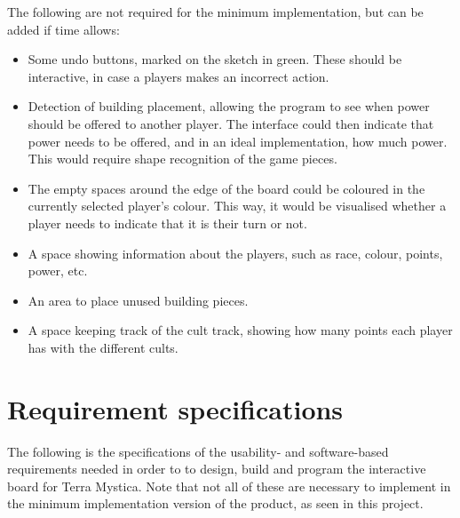 The following are not required for the minimum implementation, but can be added if time allows:
\begin{itemize}
\item Some undo buttons, marked on the sketch in green. These should be interactive, in case a players makes an incorrect action.
\item Detection of building placement, allowing the program to see when power should be offered to another player. The interface could then indicate that power needs to be offered, and in an ideal implementation, how much power. This would require shape recognition of the game pieces.
\item The empty spaces around the edge of the board could be coloured in the currently selected player's colour. This way, it would be visualised whether a player needs to indicate that it is their turn or not.
\item A space showing information about the players, such as race, colour, points, power, etc.
\item An area to place unused building pieces.
\item A space keeping track of the cult track, showing how many points each player has with the different cults.
\end{itemize}

\section{Requirement specifications}\label{sec:ReqSpec}
The following is the specifications of the usability- and software-based requirements needed in order to to design, build and program the interactive board for Terra Mystica. Note that not all of these are necessary to implement in the minimum implementation version of the product, as seen in this project. 

